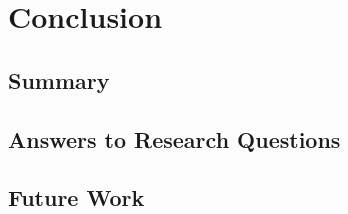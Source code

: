 \chapter{Conclusion}
\label{chap:conclusion}


\section{Summary}
\label{sec:summary}


\section{Answers to Research Questions}
\label{sec:answers}


\section{Future Work}
\label{sec:future-work}
